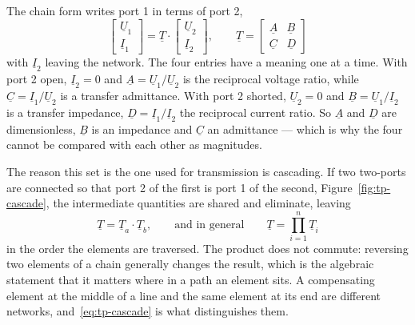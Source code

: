 The chain form writes port 1 in terms of port 2,
\begin{equation}
  \begin{bmatrix} \underline{U}_1 \\ \underline{I}_1 \end{bmatrix}
  =
  \underline{T} \cdot
  \begin{bmatrix} \underline{U}_2 \\ \underline{I}_2 \end{bmatrix},
  \qquad
  \underline{T} =
  \begin{bmatrix} \underline{A} & \underline{B} \\
                  \underline{C} & \underline{D} \end{bmatrix}
  \label{eq:tp-chain}
\end{equation}
with $\underline{I}_2$ leaving the network. The four entries have a meaning
one at a time. With port 2 open, $\underline{I}_2 = 0$ and $\underline{A} =
\underline{U}_1/\underline{U}_2$ is the reciprocal voltage ratio, while
$\underline{C} = \underline{I}_1/\underline{U}_2$ is a transfer admittance.
With port 2 shorted, $\underline{U}_2 = 0$ and $\underline{B} =
\underline{U}_1/\underline{I}_2$ is a transfer impedance, $\underline{D} =
\underline{I}_1/\underline{I}_2$ the reciprocal current ratio. So
$\underline{A}$ and $\underline{D}$ are dimensionless, $\underline{B}$ is an
impedance and $\underline{C}$ an admittance --- which is why the four cannot
be compared with each other as magnitudes.

The reason this set is the one used for transmission is cascading. If two
two-ports are connected so that port 2 of the first is port 1 of the second,
Figure~\ref{fig:tp-cascade}, the intermediate quantities are shared and
eliminate, leaving
\begin{equation}
  \underline{T} = \underline{T}_a \cdot \underline{T}_b,
  \qquad\text{and in general}\qquad
  \underline{T} = \prod_{i=1}^{n} \underline{T}_i
  \label{eq:tp-cascade}
\end{equation}
in the order the elements are traversed. The product does not commute:
reversing two elements of a chain generally changes the result, which is the
algebraic statement that it matters where in a path an element sits. A
compensating element at the middle of a line and the same element at its end
are different networks, and~\eqref{eq:tp-cascade} is what distinguishes
them.

